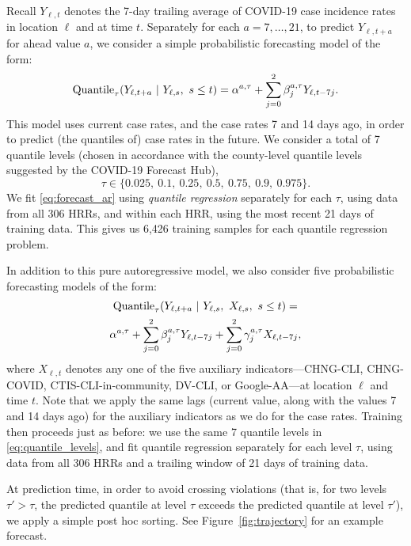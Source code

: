 \documentclass[9pt,twocolumn,twoside,lineno]{pnas-new}
\begin{document}
Recall $Y_{\ell,t}$ denotes the 7-day trailing average of COVID-19 case
incidence rates in location $\ell$ and at time $t$.  Separately for each
$a=7,\ldots,21$, to predict $Y_{\ell,t+a}$ for ahead value $a$, we consider a
simple probabilistic forecasting model of the form:     
\begin{equation}
\label{eq:forecast_ar}
\mathrm{Quantile}_\tau(Y_{\ell,t+a} \ | \ Y_{\ell,s},\ s \leq t)   
= \alpha^{a,\tau} + \sum_{j=0}^2 \beta^{a,\tau}_j Y_{\ell,t-7j}.  
\end{equation}
This model uses current case rates, and the case rates 7 and 14 days ago, in
order to predict (the quantiles of) case rates in the future.  We consider a
total of 7 quantile levels (chosen in accordance with the county-level quantile
levels suggested by the COVID-19 Forecast Hub),      
\begin{equation}
\label{eq:quantile_levels}
\tau \in \{0.025,\ 0.1,\ 0.25,\ 0.5,\ 0.75,\ 0.9,\ 0.975 \}.
\end{equation}
We fit \eqref{eq:forecast_ar} using \textit{quantile regression}
\cite{Koenker:1978, Koenker:2005, Koenker:2006} separately for each $\tau$, 
using data from all 306 HRRs, and within each HRR, using the most recent 21 days
of training data.  This gives us 6,426 training samples for each quantile 
regression problem.    

In addition to this pure autoregressive model, we also consider five
probabilistic forecasting models of the form:  
\begin{multline}
\label{eq:forecast_ar_x}
\mathrm{Quantile}_\tau(Y_{\ell,t+a} \ | \ Y_{\ell,s},\ X_{\ell,s},\ s \leq t) 
= \\ \alpha^{a,\tau} + \sum_{j=0}^2 \beta^{a,\tau}_j Y_{\ell,t-7j} + 
\sum_{j=0}^2 \gamma^{a,\tau}_j X_{\ell,t-7j},
\end{multline}
where $X_{\ell,t}$ denotes any one of the five auxiliary indicators---CHNG-CLI, 
CHNG-COVID, CTIS-CLI-in-community, DV-CLI, or Google-AA---at location $\ell$ and
time $t$. Note that we apply the same lags (current value, along with the values
7 and 14 days ago) for the auxiliary indicators as we do for the case
rates. Training then proceeds just as before: we use the same 7 quantile levels
in \eqref{eq:quantile_levels}, and fit quantile regression separately for each 
level $\tau$, using data from all 306 HRRs and a trailing window of 21 days of
training data.

At prediction time, in order to avoid crossing violations (that is, for two
levels $\tau' > \tau$, the predicted quantile at level $\tau$ exceeds the
predicted quantile at level $\tau'$), we apply a simple post hoc sorting.  See 
Figure~\ref{fig:trajectory} for an example forecast. 
\end{document}
